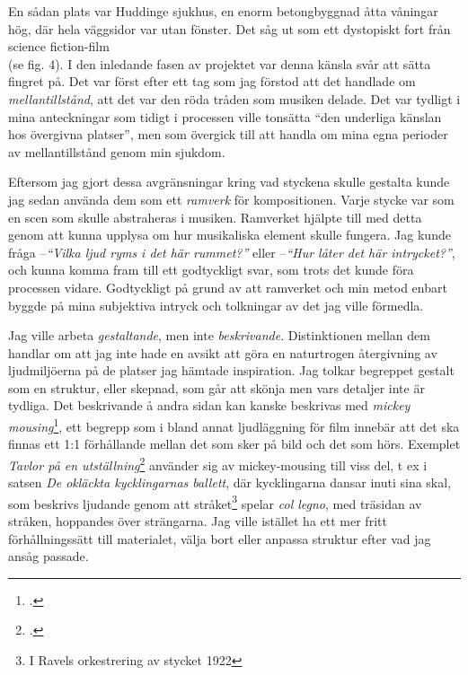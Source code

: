 \documentclass{article}
\begin{document}
En sådan plats var Huddinge sjukhus, en enorm betongbyggnad åtta våningar hög, där hela väggsidor var utan
fönster. Det såg ut som ett dystopiskt fort från science fiction-film \\(se fig. 4). I den inledande fasen av
projektet var denna känsla svår att sätta fingret på. Det var först efter ett tag som jag förstod att det
handlade om \emph{mellantillstånd}, att det var den röda tråden som musiken delade. Det var tydligt i mina
anteckningar som tidigt i processen ville tonsätta ``den underliga känslan hos övergivna platser'', men som
övergick till att handla om mina egna perioder av mellantillstånd genom min sjukdom.

Eftersom jag gjort dessa avgränsningar kring vad styckena skulle gestalta kunde jag sedan använda dem som ett
\emph{ramverk} för kompositionen. Varje stycke var som en scen som skulle abstraheras i musiken. Ramverket
hjälpte till med detta genom att kunna upplysa om hur musikaliska element skulle fungera. Jag kunde fråga 
--\emph{``Vilka ljud ryms i det här rummet?''} eller --\emph{``Hur låter det här intrycket?''}, och kunna
komma fram till ett godtyckligt svar, som trots det kunde föra processen vidare. Godtyckligt på grund av att
ramverket och min metod enbart byggde på mina subjektiva intryck och tolkningar av det jag ville förmedla.


Jag ville arbeta \emph{gestaltande}, men inte \emph{beskrivande}. Distinktionen mellan dem handlar om att jag
inte hade en avsikt att göra en naturtrogen återgivning av ljudmiljöerna på de platser jag hämtade
inspiration. Jag tolkar begreppet gestalt som en struktur, eller skepnad, som går att skönja men vars detaljer
inte är tydliga. Det beskrivande å andra sidan kan kanske beskrivas med \emph{mickey
mousing}\footcite{mickeymouse}, ett begrepp som i bland annat ljudläggning för film innebär att det ska finnas
ett 1:1 förhållande mellan det som sker på bild och det som hörs. Exemplet \emph{Tavlor på en
utställning}\footcite{Tavlor} använder sig av mickey-mousing till viss del, t ex i satsen \emph{De okläckta
kycklingarnas ballett}, där kycklingarna dansar inuti sina skal, som beskrivs ljudande genom att
stråket\footnote{I Ravels orkestrering av stycket 1922} spelar \emph{col legno}, med träsidan av stråken,
hoppandes över strängarna. Jag ville istället ha ett mer fritt förhållningssätt till materialet, välja bort
eller anpassa struktur efter vad jag ansåg passade.
\end{document}
